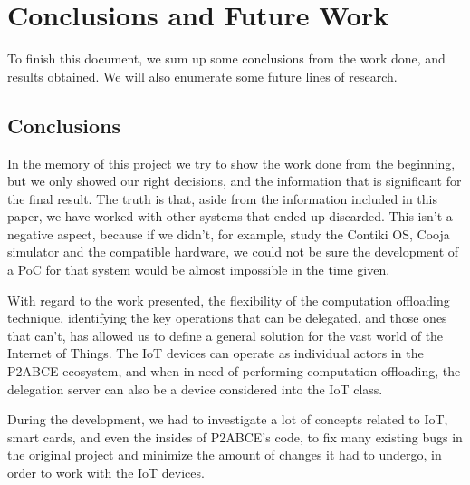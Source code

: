 \section{Conclusions and Future Work}\label{ch:conclusions}

To finish this document, we sum up some conclusions from the work done, and results 
obtained. We will also enumerate some future lines of research.

\subsection{Conclusions}


In the memory of this project we try to show the work done from the beginning, but we only showed our right decisions, and the information that is significant for the final result. The truth is that, aside from the information included in this paper, we have worked with other systems that ended up discarded. This isn't a negative aspect, because if we didn't, for example, study the Contiki OS, Cooja simulator and the compatible hardware, we could not be sure the development of a PoC for that system would be almost impossible in the time given.


With regard to the work presented, the flexibility of the computation offloading technique, identifying the key operations that can be delegated, and those ones that can't, has allowed us to define a general solution for the vast world of the Internet of Things. The IoT devices can operate as individual actors in the P2ABCE ecosystem, and when in need of performing computation offloading, the delegation server can also be a device considered into the IoT class.




During the development, we had to investigate a lot of concepts related to IoT, smart cards, and even the insides of P2ABCE's code, to fix many existing bugs in the original project and minimize the amount of changes it had to undergo, in order to work with the IoT devices.%

